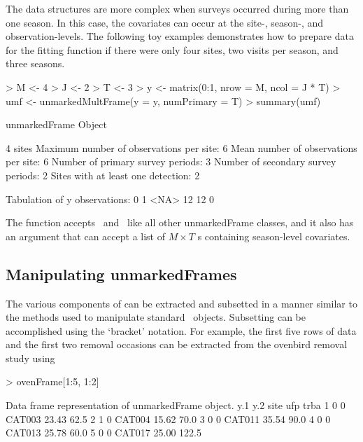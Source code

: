 \documentclass[article,shortnames]{jss}
\newcommand{\rlang}{\proglang{R}}
\newcommand{\scovs}{\code{siteCovs}}
\newcommand{\ocovs}{\code{obsCovs}}
\begin{document}
The data structures are more complex when surveys occurred during more than one
season. In this case, the covariates can occur at the site-, season-, and
observation-levels. The following toy examples demonstrates how to prepare data
for the  fitting function if there were only four sites, two
visits per season, and three seasons.

\begin{Schunk}
\begin{Sinput}
> M <- 4
> J <- 2
> T <- 3
> y <- matrix(0:1, nrow = M, ncol = J * T)
> umf <- unmarkedMultFrame(y = y, numPrimary = T)
> summary(umf)
\end{Sinput}
\begin{Soutput}
unmarkedFrame Object

4 sites
Maximum number of observations per site: 6 
Mean number of observations per site: 6 
Number of primary survey periods: 3 
Number of secondary survey periods: 2 
Sites with at least one detection: 2 

Tabulation of y observations:
   0    1 <NA> 
  12   12    0 
\end{Soutput}
\end{Schunk}

The function  accepts \scovs\ and \ocovs\ like all 
other unmarkedFrame classes, and it also has an argument 
that can accept a list of $M \times T$ s containing season-level
covariates.

\subsection{Manipulating unmarkedFrames}
\label{sec:manip}

The various components of  can be extracted and subsetted in
a manner similar to the methods used to manipulate standard \rlang\ objects.  
Subsetting can be accomplished using the `bracket' notation. For example, 
the first five rows of data and the first two removal occasions can be 
extracted from the ovenbird removal study using

\begin{Schunk}
\begin{Sinput}
> ovenFrame[1:5, 1:2]
\end{Sinput}
\begin{Soutput}
Data frame representation of unmarkedFrame object.
  y.1 y.2   site   ufp  trba
1   0   0 CAT003 23.43  62.5
2   1   0 CAT004 15.62  70.0
3   0   0 CAT011 35.54  90.0
4   0   0 CAT013 25.78  60.0
5   0   0 CAT017 25.00 122.5
\end{Soutput}
\end{Schunk}
\end{document}
